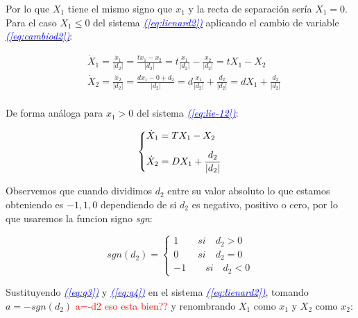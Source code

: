 \documentclass[12pt,a4paper]{report} %
\newcommand{\eref}[1]{\hyperref[#1]{\textcolor{blue}{\textit{(\ref*{#1})}}}}
\begin{document}
	\noindent Por lo que $X_1$ tiene el mismo signo que $x_1$ y la recta de separación sería $X_1=0$.\\[0.5cm]
	Para el caso $X_1\leq 0$ del sistema \eref{eq:lienard2} aplicando el cambio de variable \eref{eq:cambiod2}:
	
	\begin{equation}
		\label{eq:q3}
		\begin{aligned}
			&\dot{X}_1=\frac{\dot{x}_1}{|d_2|}=\frac{tx_1-x_2}{|d_2|}=t\frac{x_1}{|d_2|}-\frac{x_2}{|d_2|}=tX_1-X_2\\[2mm]
			&\dot{X}_2=\frac{\dot{x}_2}{|d_2|}=\frac{dx_1-0+d_2}{|d_2|}=d\frac{x_1}{|d_2|}+\frac{d_2}{|d_2|}=dX_1+\frac{d_2}{|d_2|}\\[2mm]
		\end{aligned}
	\end{equation}\smallskip
	
	\noindent De forma análoga para $x_1>0$ del sistema \eref{eq:lie-12}:
	
	\begin{equation}
		\label{eq:q4}
		\scalebox{1}{$\displaystyle
			\left\{
			\begin{aligned}
				&\dot{X}_1=TX_1-X_2 \\[2mm]
				&\dot{X}_2=DX_1+\frac{d_2}{|d_2|}
			\end{aligned}
			\right.
			$}
	\end{equation}\smallskip
	
	\noindent Observemos que cuando dividimos $d_2$ entre su valor absoluto lo que estamos obteniendo es $-1,1,0$ dependiendo de si $d_2$ es negativo, positivo o cero, por lo que usaremos la funcion signo \textit{sgn}:
	
	\begin{equation}
		\label{eq:sgn}
		sgn(d_2)=\left\{
		\begin{aligned}
		1 \qquad si  \quad d_2>0 \\
		0 \qquad si  \quad d_2=0 \\
		-1 \qquad si \quad d_2<0 
    	\end{aligned}
		\right.
	\end{equation}\smallskip
	
	\noindent Sustituyendo \eref{eq:q3} y \eref{eq:q4} en el sistema \eref{eq:lienard2}, tomando $a=-sgn(d_2)$ \textcolor{red}{a=-d2 eso esta bien??} y renombrando $X_1$ como $x_1$ y $X_2$ como $x_2$:
	
\end{document}
